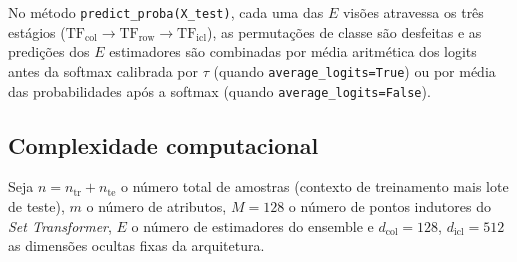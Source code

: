 \documentclass[11pt,a4paper]{article}
\begin{document}
No método \texttt{predict\_proba(X\_test)}, cada uma das $E$ visões atravessa os três estágios ($\mathrm{TF}_{\mathrm{col}} \to \mathrm{TF}_{\mathrm{row}} \to \mathrm{TF}_{\mathrm{icl}}$), as permutações de classe são desfeitas e as predições dos $E$ estimadores são combinadas por média aritmética dos logits antes da softmax calibrada por $\tau$ (quando \texttt{average\_logits=True}) ou por média das probabilidades após a softmax (quando \texttt{average\_logits=False}).

\subsection{Complexidade computacional}
\label{sec:complexidade}

Seja $n = n_{\mathrm{tr}} + n_{\mathrm{te}}$ o número total de amostras (contexto de treinamento mais lote de teste), $m$ o número de atributos, $M = 128$ o número de pontos indutores do \emph{Set Transformer}, $E$ o número de estimadores do ensemble e $d_{\mathrm{col}} = 128$, $d_{\mathrm{icl}} = 512$ as dimensões ocultas fixas da arquitetura.
\end{document}
